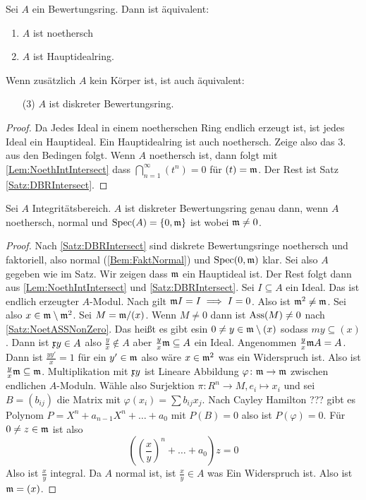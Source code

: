 \begin{Satz} Sei \(A\) ein Bewertungsring. Dann ist äquivalent:
	\begin{enumerate}
		\item \(A\) ist noethersch
		\item \(A\) ist Hauptidealring.
	\end{enumerate}
	Wenn zusätzlich \(A\) kein Körper ist, ist auch äquivalent:
	\begin{enumerate}
		\item[(3)] \(A\) ist diskreter Bewertungsring.
	\end{enumerate}
	\begin{proof}
		Da Jedes Ideal in einem noetherschen Ring endlich erzeugt ist, ist jedes Ideal ein Hauptideal.
		Ein Hauptidealring ist auch noethersch.
		Zeige also das 3. aus den Bedingen folgt.
		Wenn \(A\) noethersch ist, dann folgt mit \cref{Lem:NoethIntIntersect}
		dass \(\bigcap_{n=1}^\infty (t^n)=0\) für \((t)=\mathfrak{m}\). Der Rest ist Satz \cref{Satz:DBRIntersect}.
	\end{proof}
\end{Satz}
\begin{Satz}\label{Satz:DBRNormNoeth1dim} Sei \(A\) Integritätsbereich. \(A\) ist diskreter Bewertungsring genau dann, wenn \(A\) noethersch,
	normal und \(\operatorname{Spec}(A)=\{0,\mathfrak{m}\}\) ist wobei \(\mathfrak{m}\neq 0\).
	
\end{Satz}
\begin{proof}
	Nach \cref{Satz:DBRIntersect} sind diskrete Bewertungsringe noethersch und faktoriell, also normal (\cref{Bem:FaktNormal}) und \(\operatorname{Spec}(0,\mathfrak{m})\) klar.
	Sei also \(A\) gegeben wie im Satz.
	Wir zeigen dass \(\mathfrak{m}\) ein Hauptideal ist. Der Rest folgt dann aus \cref{Lem:NoethIntIntersect} und \cref{Satz:DBRIntersect}.
	Sei \(I\subseteq A\) ein Ideal. Das ist endlich erzeugter \(A\)-Modul. Nach 
	gilt \(\mathfrak{m} I=I\implies I=0\). Also ist \(\mathfrak{m}^2\neq \mathfrak{m}\).
	Sei also \(x\in \mathfrak{m}\setminus \mathfrak{m}^2\).
	Sei \(M=\mathfrak{m}/(x)\). Wenn \(M\neq 0\) dann ist \(\operatorname{Ass}(M)\neq 0\) nach \cref{Satz:NoetASSNonZero}.
	Das heißt es gibt esin \(0\neq y\in \mathfrak{m}\setminus (x)\) sodass \(my\subseteq (x)\).
	Dann ist \(\frak x y\in A\) also \(\frac y x\not\in A\) aber \(\frac y x\mathfrak{m}\subseteq A\) ein Ideal.
	Angenommen \(\frac y x\mathfrak{m} A=A\). Dann ist \(\frac{yy'}{x}=1\) für ein \(y'\in \mathfrak{m}\) also wäre
	\(x\in\mathfrak{m}^2\) was ein Widerspruch ist. Also ist \(\frac y x\mathfrak{m} \subseteq \mathfrak{m}\).
	Multiplikation mit \(\frak x y\) ist Lineare Abbildung \(\varphi\colon\mathfrak{m}\to\mathfrak{m}\) zwischen endlichen
	\(A\)-Moduln. Wähle also Surjektion \(\pi\colon R^n\to M, e_i\mapsto x_i\) und sei \(B=(b_{ij})\) die Matrix mit
	\(\varphi(x_i)=\sum b_{ij}x_j\). Nach Cayley Hamilton ??? gibt es Polynom \(P=X^n+a_{n-1}X^n+\dots+a_0\) mit 
	\(P(B)=0\) also ist \(P(\varphi)=0\).  Für \(0\neq z\in\mathfrak{m}\) ist also
	\[((\frac x y)^n+\dots+a_0)z=0\] Also ist \(\frac x y\) integral. Da \(A\) normal ist, ist \(\frac x y\in A\) was Ein Widerspruch ist.
	Also ist \(\mathfrak{m}=(x)\).
\end{proof}
